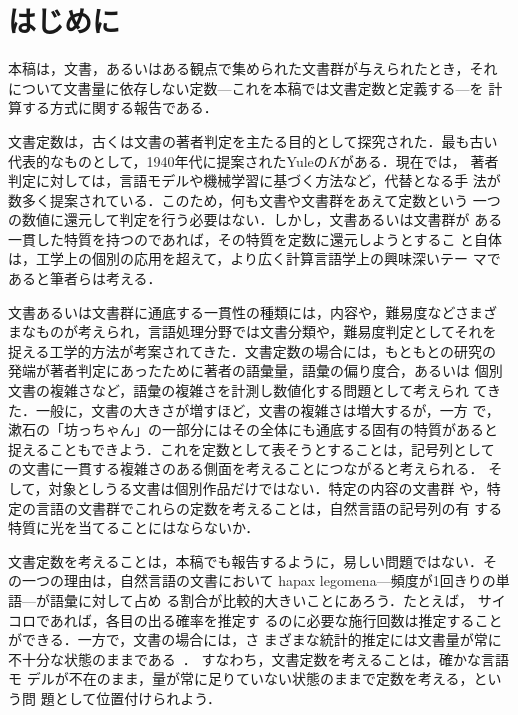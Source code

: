 \documentclass[japanese]{jnlp_JS2.0}
\begin{document}
\maketitle


\section{はじめに}

本稿は，文書，あるいはある観点で集められた文書群が与えられたとき，それ
について文書量に依存しない定数—これを本稿では文書定数と定義する—を
計算する方式に関する報告である．

文書定数は，古くは文書の著者判定を主たる目的として探究された．最も古い
代表的なものとして，1940年代に提案されたYuleの$K$がある．現在では，
著者判定に対しては，言語モデルや機械学習に基づく方法など，代替となる手
法が数多く提案されている．このため，何も文書や文書群をあえて定数という
一つの数値に還元して判定を行う必要はない．しかし，文書あるいは文書群が
ある一貫した特質を持つのであれば，その特質を定数に還元しようとするこ
と自体は，工学上の個別の応用を超えて，より広く計算言語学上の興味深いテー
マであると筆者らは考える．

文書あるいは文書群に通底する一貫性の種類には，内容や，難易度などさまざ
まなものが考えられ，言語処理分野では文書分類や，難易度判定としてそれを
捉える工学的方法が考案されてきた．文書定数の場合には，もともとの研究の
発端が著者判定にあったために著者の語彙量，語彙の偏り度合，あるいは
個別文書の複雑さなど，語彙の複雑さを計測し数値化する問題として考えられ
てきた．一般に，文書の大きさが増すほど，文書の複雑さは増大するが，一方
で，漱石の「坊っちゃん」の一部分にはその全体にも通底する固有の特質があると
捉えることもできよう．これを定数として表そうとすることは，記号列として
の文書に一貫する複雑さのある側面を考えることにつながると考えられる．
そして，対象としうる文書は個別作品だけではない．特定の内容の文書群
や，特定の言語の文書群でこれらの定数を考えることは，自然言語の記号列の有
する特質に光を当てることにはならないか．

文書定数を考えることは，本稿でも報告するように，易しい問題ではない．そ
の一つの理由は，自然言語の文書において
hapax legomena—頻度が1回きりの単語—が語彙に対して占め
る割合が比較的大きいことにあろう．たとえば，
サイコロであれば，各目の出る確率を推定す
るのに必要な施行回数は推定することができる．一方で，文書の場合には，さ
まざまな統計的推定には文書量が常に不十分な状態のままである~\cite{kyo,Baayen}．
すなわち，文書定数を考えることは，確かな言語モ
デルが不在のまま，量が常に足りていない状態のままで定数を考える，という問
題として位置付けられよう．
\end{document}
